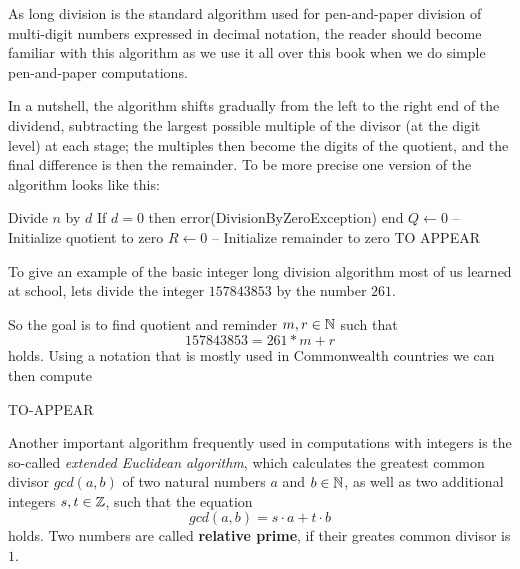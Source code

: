 As long division is the standard algorithm used for pen-and-paper division of multi-digit numbers expressed in decimal notation, the reader should become familiar with this algorithm as we use it all over this book when we do simple pen-and-paper computations.

In a nutshell, the algorithm shifts gradually from the left to the right end of the dividend, subtracting the largest possible multiple of the divisor (at the digit level) at each stage; the multiples then become the digits of the quotient, and the final difference is then the remainder. To be more precise one version of the algorithm looks like this:

\begin{algorithmic}
\State Divide $n$ by $d$
\State If $d = 0$ then error(DivisionByZeroException) end
\State $Q \leftarrow 0 $ -- Initialize quotient to zero
\State $R \leftarrow 0 $ -- Initialize remainder to zero               
\State TO APPEAR
\end{algorithmic}

\begin{example} To give an example of the basic integer long division algorithm most of us learned at school, lets divide the integer $157843853$ by the number $261$. 

So the goal is to find quotient and reminder $m,r \in \mathbb{N}$ such that
$$157843853 = 261 * m +r$$
holds. Using a notation that is mostly used in Commonwealth countries we can then compute

TO-APPEAR 
\end{example}

Another important algorithm frequently used in computations with integers is the so-called \textit{extended Euclidean algorithm}, which calculates the greatest common divisor $ gcd (a, b) $ of two natural numbers $ a $ and $ b \in \mathbb{N} $, as well as two additional integers $ s, t \in \mathbb{Z} $, such that the equation
\begin{equation}
\label{eq: erw_Eukl_algo}
gcd (a, b) = s \cdot a + t \cdot b
\end{equation}
holds. Two numbers are called \textbf{relative prime}, if their greates common divisor is $1$.

